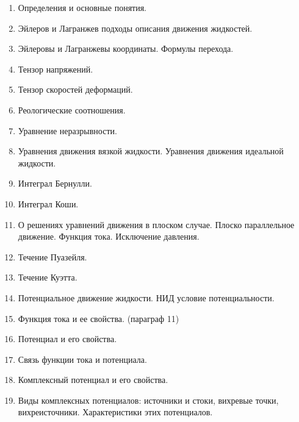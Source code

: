 \begin{enumerate}
\item
Определения и основные понятия.
\item
Эйлеров и Лагранжев подходы описания движения жидкостей.
\item
Эйлеровы и Лагранжевы координаты. Формулы перехода.
\item
Тензор напряжений.
\item
Тензор скоростей деформаций.
\item
Реологические соотношения.
\item
Уравнение неразрывности.
\item
Уравнения движения вязкой жидкости. Уравнения движения идеальной жидкости.
\item
Интеграл  Бернулли.
\item
Интеграл Коши.
\item
О решениях уравнений движения в плоском случае. Плоско параллельное движение. Функция тока. Исключение давления.
\item
Течение Пуазейля.
\item
Течение Куэтта.
\item
Потенциальное движение жидкости. НИД условие потенциальности.
\item
Функция тока и ее свойства.  (параграф 11)
\item
Потенциал и его свойства.
\item
Связь функции тока и потенциала.
\item
Комплексный потенциал и его свойства.
\item
Виды комплексных потенциалов: источники и стоки, вихревые точки, вихреисточники. Характеристики  этих потенциалов.
\end{enumerate}
